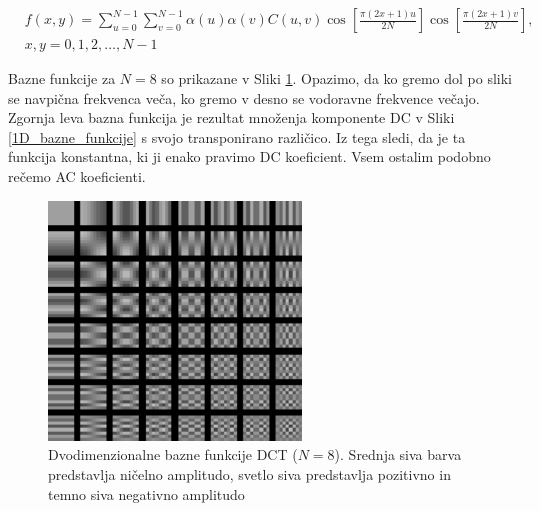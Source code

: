 \documentclass[a4paper,12pt,openright]{book}
\begin{document}
\begin{equation}
    \begin{aligned}
    &f(x,y) = \sum_{u=0}^{N-1}\sum_{v=0}^{N-1} \alpha(u) \alpha(v) C(u,v)
    \cos\left[\frac{\pi(2x+1)u}{2N}\right]
    \cos\left[\frac{\pi(2x+1)v}{2N}\right],  \\
    &x,y = 0,1,2,\ldots,N-1
    \end{aligned}
\label{eq:2D-DCT-inverse}
\end{equation}

Bazne funkcije za $N=8$ so prikazane v Sliki \ref{2D_bazne_funkcije}. Opazimo, da ko gremo dol po sliki se navpična frekvenca veča, ko gremo v desno se vodoravne frekvence večajo. Zgornja leva bazna funkcija je rezultat množenja komponente DC v Sliki \ref{1D_bazne_funkcije} s svojo transponirano različico. Iz tega sledi, da je ta funkcija konstantna, ki ji enako pravimo DC koeficient. Vsem ostalim podobno rečemo AC koeficienti.\par

\begin{figure}[ht] %
\begin{center}
\includegraphics[width=0.6\textwidth]{slike/bazne_funkcije_2D.pdf}
\end{center}
\caption{Dvodimenzionalne bazne funkcije DCT ($N=8$). Srednja siva barva predstavlja ničelno amplitudo, svetlo siva predstavlja pozitivno in temno siva negativno amplitudo}
\label{2D_bazne_funkcije}
\end{figure}
\end{document}
